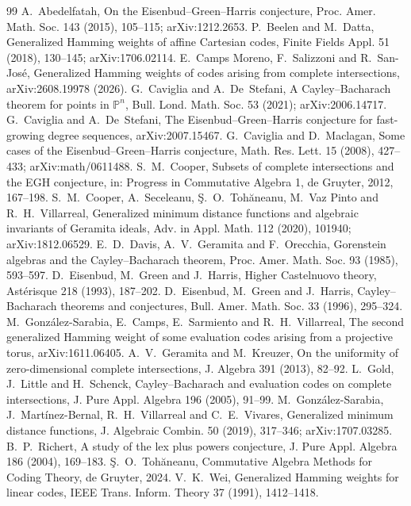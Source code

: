 \documentclass[11pt]{amsart}
\theoremstyle{remark}
\theoremstyle{definition}
\begin{document}
\begin{thebibliography}{99}
 A.~Abedelfatah, On the Eisenbud--Green--Harris conjecture, Proc. Amer. Math. Soc. 143 (2015), 105--115; arXiv:1212.2653.
 P.~Beelen and M.~Datta, Generalized Hamming weights of affine Cartesian codes, Finite Fields Appl. 51 (2018), 130--145; arXiv:1706.02114.
 E.~Camps Moreno, F.~Salizzoni and R.~San-Jos\'e, Generalized Hamming weights of codes arising from complete intersections, arXiv:2608.19978 (2026).
 G.~Caviglia and A.~De~Stefani, A Cayley--Bacharach theorem for points in $\mathbb P^n$, Bull. Lond. Math. Soc. 53 (2021); arXiv:2006.14717.
 G.~Caviglia and A.~De~Stefani, The Eisenbud--Green--Harris conjecture for fast-growing degree sequences, arXiv:2007.15467.
 G.~Caviglia and D.~Maclagan, Some cases of the Eisenbud--Green--Harris conjecture, Math. Res. Lett. 15 (2008), 427--433; arXiv:math/0611488.
 S.~M.~Cooper, Subsets of complete intersections and the EGH conjecture, in: Progress in Commutative Algebra 1, de Gruyter, 2012, 167--198.
 S.~M.~Cooper, A.~Seceleanu, \c{S}.~O.~Toh\u{a}neanu, M.~Vaz Pinto and R.~H.~Villarreal, Generalized minimum distance functions and algebraic invariants of Geramita ideals, Adv. in Appl. Math. 112 (2020), 101940; arXiv:1812.06529.
 E.~D.~Davis, A.~V.~Geramita and F.~Orecchia, Gorenstein algebras and the Cayley--Bacharach theorem, Proc. Amer. Math. Soc. 93 (1985), 593--597.
 D.~Eisenbud, M.~Green and J.~Harris, Higher Castelnuovo theory, Ast\'erisque 218 (1993), 187--202.
 D.~Eisenbud, M.~Green and J.~Harris, Cayley--Bacharach theorems and conjectures, Bull. Amer. Math. Soc. 33 (1996), 295--324.
 M.~Gonz\'alez-Sarabia, E.~Camps, E.~Sarmiento and R.~H.~Villarreal, The second generalized Hamming weight of some evaluation codes arising from a projective torus, arXiv:1611.06405.
 A.~V.~Geramita and M.~Kreuzer, On the uniformity of zero-dimensional complete intersections, J. Algebra 391 (2013), 82--92.
 L.~Gold, J.~Little and H.~Schenck, Cayley--Bacharach and evaluation codes on complete intersections, J. Pure Appl. Algebra 196 (2005), 91--99.
 M.~Gonz\'alez-Sarabia, J.~Mart\'inez-Bernal, R.~H.~Villarreal and C.~E.~Vivares, Generalized minimum distance functions, J. Algebraic Combin. 50 (2019), 317--346; arXiv:1707.03285.
 B.~P.~Richert, A study of the lex plus powers conjecture, J. Pure Appl. Algebra 186 (2004), 169--183.
 \c{S}.~O.~Toh\u{a}neanu, Commutative Algebra Methods for Coding Theory, de Gruyter, 2024.
 V.~K.~Wei, Generalized Hamming weights for linear codes, IEEE Trans. Inform. Theory 37 (1991), 1412--1418.
\end{thebibliography}
\end{document}
